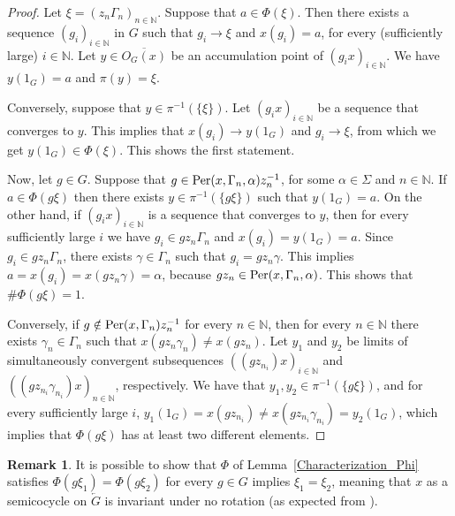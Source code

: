 \documentclass[titlepage,reqno,10pt]{amsart}
\theoremstyle{definition}
\newtheorem{remark}[theorem]{Remark}
\def\Per{{\rm Per}}
\begin{document}
\begin{proof}
Let $\xi=(z_n\Gamma_n)_{n\in\mathbb{N}}$.
Suppose that $a\in \Phi(\xi)$. Then there exists a sequence $(g_i)_{i\in\mathbb{N}}$ in $G$ such that $g_i\to \xi$ and $x(g_i)=a$, for every (sufficiently large) $i\in \mathbb{N}$. Let $y\in \overline{O_G(x)}$ be an accumulation point of $(g_ix)_{i\in\mathbb{N}}$. We have $y(1_G)=a$ and $\pi(y)=\xi$.  

Conversely, suppose that $y\in \pi^{-1}(\{\xi\})$. Let $(g_ix)_{i\in\mathbb{N}}$ be a sequence that converges to $y$. This implies that $x(g_i)\to y(1_G)$ and $g_i\to \xi$, from which we get $y(1_G)\in \Phi(\xi)$. 
This shows the first statement.
 

Now, let $g\in G$. Suppose that $g\in \Per(x,\Gamma_n,\alpha)z_n^{-1}$, for some $\alpha\in\Sigma$ and $n\in\mathbb{N}$. If $a\in \Phi(g\xi)$ then there exists $y\in \pi^{-1}(\{g\xi\})$ such that $y(1_G)=a$. On the other hand, if $(g_ix)_{i\in\mathbb{N}}$ is a sequence that converges to $y$, then for every sufficiently large $i$ we have $g_i\in gz_n\Gamma_n$ and $x(g_i)=y(1_G)=a$. Since $g_i\in gz_n\Gamma_n$, there exists $\gamma\in \Gamma_n$ such that $g_i=gz_n\gamma$. This implies $a=x(g_i)=x(gz_n\gamma)=\alpha$, because $gz_n\in\Per(x,\Gamma_n,\alpha)$. This shows that $\#\Phi(g\xi)=1$. 

Conversely, if $g\notin \Per(x,\Gamma_n)z_n^{-1}$ for every $n\in \mathbb{N}$, then for every $n\in \mathbb{N}$ there exists $\gamma_n\in\Gamma_n$ such that $x(gz_n\gamma_n)\neq x(gz_n)$. Let $y_1$ and $y_2$ be limits  of  simultaneously convergent subsequences $((gz_{n_i})x)_{i\in\mathbb{N}}$ and $((gz_{n_i}\gamma_{n_i})x)_{n\in\mathbb{N}}$, respectively. We have that $y_1,y_2\in \pi^{-1}(\{g\xi\})$, and for every sufficiently large $i$, $y_1(1_G)=x(gz_{n_i})\neq x(gz_{n_i}\gamma_{n_i})=y_2(1_G)$, which implies that $\Phi(g\xi)$ has at least two different elements.
\end{proof}
 
\begin{remark}\label{rem: Toeplitz is invariant under no rotations}
It is possible to show that $\Phi$ of Lemma~\ref{Characterization_Phi} satisfies $\Phi(g\xi_1)=\Phi(g\xi_2)$ for every $g\in G$ implies $\xi_1=\xi_2$, meaning that $x$ as a semicocycle on $\overleftarrow{G}$ is invariant under no rotation (as expected from \cite{FK18}). 
\end{remark}
\end{document}
